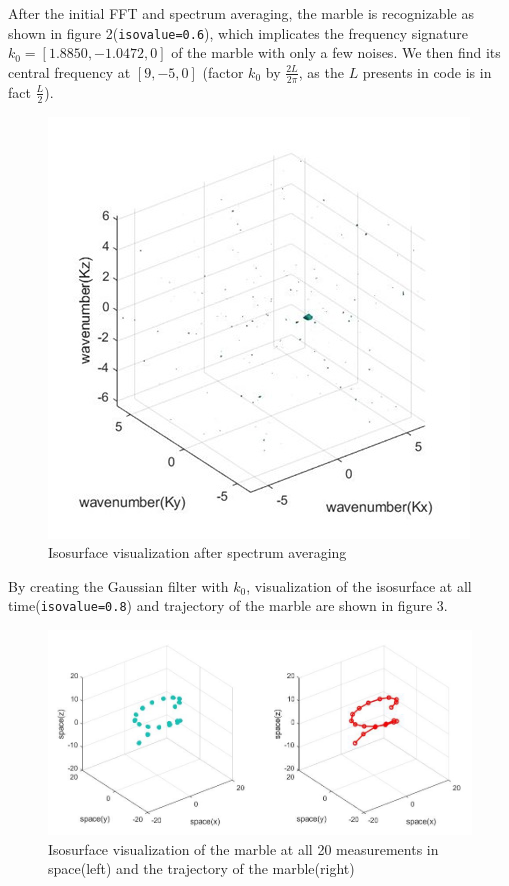 \documentclass[11pt,a4paper]{article}
\numberwithin{equation}{subsection}
\begin{document}
After the initial FFT and spectrum averaging, the marble is recognizable as shown in figure 2(\texttt{isovalue=0.6}), which implicates the frequency signature $k_0 = [1.8850, -1.0472, 0]$ of the marble with only a few noises. We then find its central frequency at $[9, -5, 0]$ (factor $k_0$ by $\frac{2L}{2\pi}$, as the $L$ presents in code is in fact $\frac{L}{2}$).\\

	\begin{figure}[H]
		\begin{center}
			\includegraphics[scale=0.60]{Figure2.jpg}
			\caption{Isosurface visualization after spectrum averaging}
		\end{center}
	\end{figure}

By creating the Gaussian filter with $k_0$, visualization of the isosurface at all time(\texttt{isovalue=0.8}) and trajectory of the marble are shown in figure 3.

	\begin{figure}[H]
		\begin{center}
			\includegraphics[scale=0.50]{Figure3.jpg}
			\caption{Isosurface visualization of the marble at all 20 measurements in space(left) and the trajectory of the marble(right)}
		\end{center}
	\end{figure}
\end{document}
